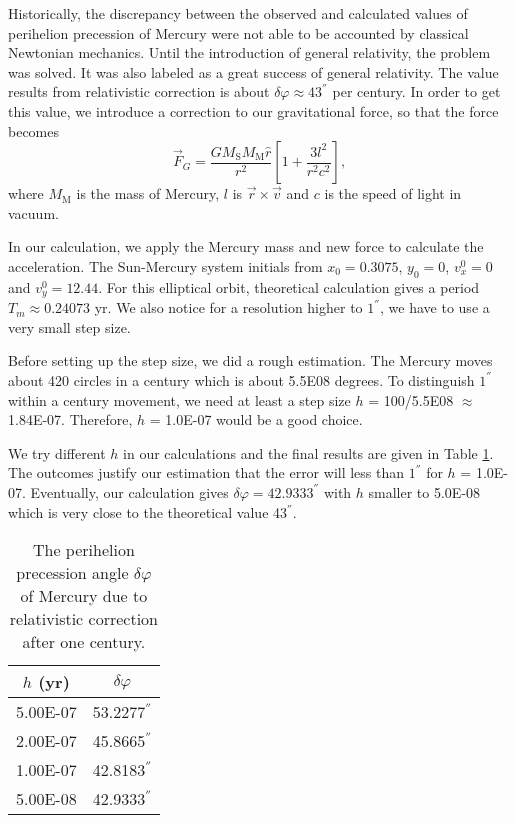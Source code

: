 Historically, the discrepancy between the observed and calculated values of perihelion precession of Mercury were not able to be accounted by classical Newtonian mechanics.
Until the introduction of general relativity, the problem was solved.
It was also labeled as a great success of general relativity.
The value results from relativistic correction is about $\delta \varphi\approx 43^{''}$ per century\cite{wiki:xxx}.
In order to get this value, we introduce a correction to our gravitational force, so that the force becomes
\begin{equation}
	\vec{F}_G = \frac{GM_{\mathrm{S}}M_{\mathrm{M}}\hat{r}}{r^2}\left[1+\frac{3l^2}{r^2c^2}\right],
\end{equation}
where $M_{\mathrm{M}}$ is the mass of Mercury, $l$ is $\vec{r}\times \vec{v}$ and $c$ is the speed of light in vacuum.

In our calculation, we apply the Mercury mass and new force to calculate the acceleration.
The Sun-Mercury system initials from $x_0=0.3075$, $y_0=0$, $v_{x}^0=0$ and $v_{y}^0=12.44$. 
For this elliptical orbit, theoretical calculation gives a period $T_m\approx 0.24073$ yr.
We also notice for a resolution higher to $1^{''}$, we have to use a very small step size.

Before setting up the step size, we did a rough estimation.
The Mercury moves about 420 circles in a century which is about 5.5E08 degrees. 
To distinguish $1^{''}$ within a century movement, we need at least a step size $h$ = 100/5.5E08 $\approx$ 1.84E-07. 
Therefore, $h$ = 1.0E-07 would be a good choice.

We try different $h$ in our calculations and the final results are given in Table \ref{tab::mercury}.
The outcomes justify our estimation that the error will less than $1^{''}$ for $h$ = 1.0E-07.
Eventually, our calculation gives $\delta \varphi=42.9333^{''}$ with $h$ smaller to 5.0E-08 which is very close to the theoretical value 43$^{''}$.
\begin{table}[tb]
	\centering
	\caption{The perihelion precession angle $\delta \varphi$ of Mercury due to relativistic correction after one century. }
	\label{my-label}
	\label{tab::mercury}
	\begin{tabular}{cc}
	\hline
	\hline
	$h$ (yr)         & $\delta \varphi$     \\
	\hline
	5.00E-07 & 53.2277$^{''}$ \\
	2.00E-07 & 45.8665$^{''}$ \\
	1.00E-07 & 42.8183$^{''}$ \\
	5.00E-08 & 42.9333$^{''}$\\
	\hline
	\hline
	\end{tabular}
\end{table}